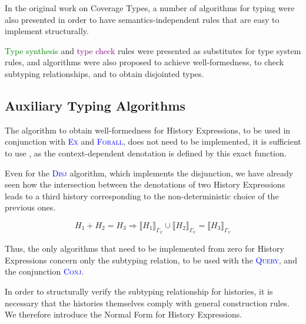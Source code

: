 In the original work on Coverage Types, a number of algorithms for typing were also presented in order to have semantics-independent rules that are easy to implement structurally.

\textcolor{Green}{Type synthesis} and \textcolor{purple}{type check} rules were presented as substitutes for type system rules, and algorithms were also proposed to achieve well-formedness, to check subtyping relationships, and to obtain disjointed types.

\subsection{Auxiliary Typing Algorithms}

The algorithm to obtain well-formedness for History Expressions, to be used in conjunction with \textsc{\textcolor{blue}{Ex}} and \textsc{\textcolor{blue}{Forall}}, does not need to be implemented, it is sufficient to use \bind, as the context-dependent denotation is defined by this exact function.

Even for the \textsc{\textcolor{blue}{Disj}} algorithm, which implements the disjunction, we have already seen how the intersection between the denotations of two History Expressions leads to a third history corresponding to the non-deterministic choice of the previous ones.

\begin{equation}
    H_1 + H_2 = H_3 \Longrightarrow \llbracket H_1 \rrbracket_{\Gamma_{\psi}} \cup \llbracket H_2 \rrbracket_{\Gamma_{\psi}} = \llbracket H_3 \rrbracket_{\Gamma_{\psi}}
\end{equation}

Thus, the only algorithms that need to be implemented from zero for History Expressions concern only the subtyping relation, to be used with the \textsc{\textcolor{blue}{Query}}, and the conjunction \textsc{\textcolor{blue}{Conj}}.

In order to structurally verify the subtyping relationship for histories, it is necessary that the histories themselves comply with general construction rules. We therefore introduce the Normal Form for History Expressions.

